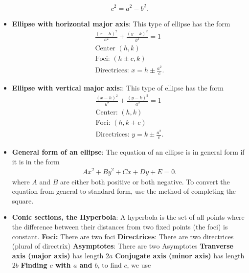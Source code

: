 \documentclass{report}
\begin{document}
\begin{itemize}
\begin{align*}
            c^{2} =  a^{2} - b^{2}
        .\end{align*}
    \item \textbf{Ellipse with horizontal major axis}: This type of ellipse has the form
        \begin{align*}
            \frac{(x-h)^{2}}{a^{2}} + \frac{(y-k)^{2}}{b^{2}} = 1 \\
            \text{Center } (h,k) \\
            \text{Foci: } (h\pm c, k) \\
            \text{Directrices: } x=h\pm \frac{a^{2}}{c}
        .\end{align*}
    \item \textbf{Ellipse with vertical major axis:}: This type of ellipse has the form
        \begin{align*}
             \frac{(x-h)^{2}}{b^{2}} + \frac{(y-k)^{2}}{a^{2}} = 1 \\
            \text{Center: } (h,k) \\
            \text{Foci: } (h, k\pm c) \\
            \text{Directrices: } y=k\pm \frac{a^{2}}{c}
        .\end{align*}
    \item \textbf{General form of an ellipse}: The equation of an ellipse is in general form if it is in the form
        \begin{align*}
            Ax^{2} +By^{2}   +Cx +Dy  +E = 0
        .\end{align*}
        where $A$ and $B$ are either both positive or both negative. To convert the equation from general to standard form, use the method of completing the square.
    \item \textbf{Conic sections, the Hyperbola}: A hyperbola is the set of all points where the difference between their distances from two fixed points (the foci) is constant.
        \bigbreak \noindent 
        \bigbreak \noindent 
        \textbf{Foci:} There are two foci
        \smallbreak \noindent
        \textbf{Directrices}: There are two directrices (plural of directrix)
        \smallbreak \noindent
        \textbf{Asymptotes}:  There are two Asymptotes
        \smallbreak \noindent
        \textbf{Tranverse axis (major axis)} has length $2a$
        \smallbreak \noindent
        \textbf{Conjugate axis (minor axis)} has length $2b$
        \smallbreak \noindent
        \textbf{Finding $c$ with $a$ and $b$}, to find $c$, we use
        \begin{align*}

\end{align*}
\end{itemize}
\end{document}
